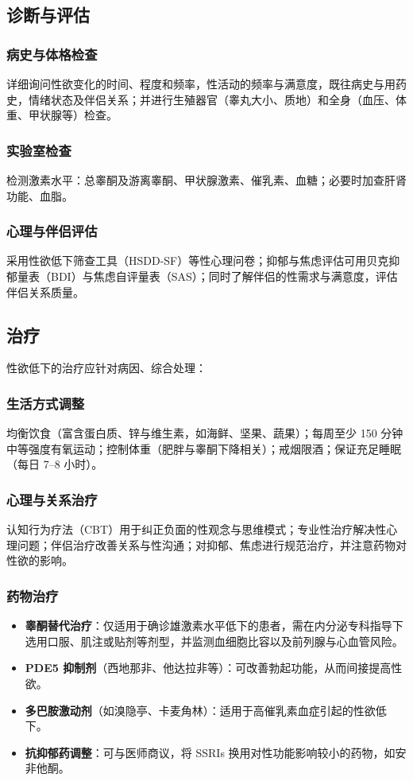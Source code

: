 \documentclass[12pt,a4paper,twoside]{ctexbook}
\begin{document}
\subsection{诊断与评估}

\subsubsection{病史与体格检查}
详细询问性欲变化的时间、程度和频率，性活动的频率与满意度，既往病史与用药史，情绪状态及伴侣关系；并进行生殖器官（睾丸大小、质地）和全身（血压、体重、甲状腺等）检查。

\subsubsection{实验室检查}
检测激素水平：总睾酮及游离睾酮、甲状腺激素、催乳素、血糖；必要时加查肝肾功能、血脂。

\subsubsection{心理与伴侣评估}
采用性欲低下筛查工具（HSDD-SF）等性心理问卷；抑郁与焦虑评估可用贝克抑郁量表（BDI）与焦虑自评量表（SAS）；同时了解伴侣的性需求与满意度，评估伴侣关系质量。

\subsection{治疗}
性欲低下的治疗应针对病因、综合处理：

\subsubsection{生活方式调整}
均衡饮食（富含蛋白质、锌与维生素，如海鲜、坚果、蔬果）；每周至少 150 分钟中等强度有氧运动；控制体重（肥胖与睾酮下降相关）；戒烟限酒；保证充足睡眠（每日 7--8 小时）。

\subsubsection{心理与关系治疗}
认知行为疗法（CBT）用于纠正负面的性观念与思维模式；专业性治疗解决性心理问题；伴侣治疗改善关系与性沟通；对抑郁、焦虑进行规范治疗，并注意药物对性欲的影响。

\subsubsection{药物治疗}
\begin{itemize}
\item \textbf{睾酮替代治疗}：仅适用于确诊雄激素水平低下的患者，需在内分泌专科指导下选用口服、肌注或贴剂等剂型，并监测血细胞比容以及前列腺与心血管风险。
\item \textbf{PDE5 抑制剂}（西地那非、他达拉非等）：可改善勃起功能，从而间接提高性欲。
\item \textbf{多巴胺激动剂}（如溴隐亭、卡麦角林）：适用于高催乳素血症引起的性欲低下。
\item \textbf{抗抑郁药调整}：可与医师商议，将 SSRIs 换用对性功能影响较小的药物，如安非他酮。
\end{itemize}
\end{document}
